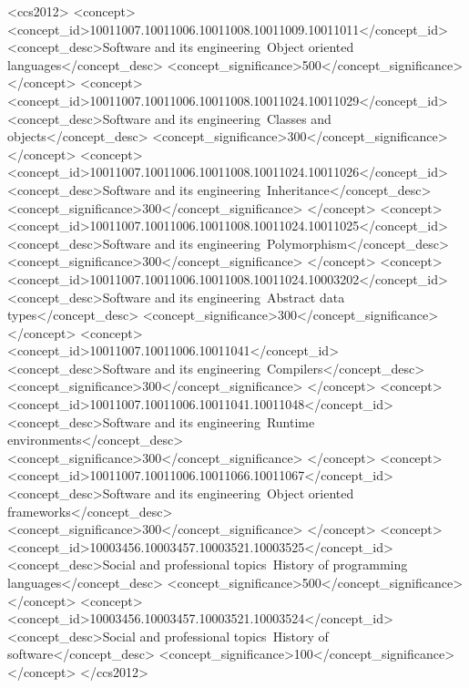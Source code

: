 \documentclass[acmsmall,screen]{acmart}
\begin{document}
\begin{CCSXML}
<ccs2012>
   <concept>
       <concept_id>10011007.10011006.10011008.10011009.10011011</concept_id>
       <concept_desc>Software and its engineering~Object oriented languages</concept_desc>
       <concept_significance>500</concept_significance>
       </concept>
   <concept>
       <concept_id>10011007.10011006.10011008.10011024.10011029</concept_id>
       <concept_desc>Software and its engineering~Classes and objects</concept_desc>
       <concept_significance>300</concept_significance>
       </concept>
   <concept>
       <concept_id>10011007.10011006.10011008.10011024.10011026</concept_id>
       <concept_desc>Software and its engineering~Inheritance</concept_desc>
       <concept_significance>300</concept_significance>
       </concept>
   <concept>
       <concept_id>10011007.10011006.10011008.10011024.10011025</concept_id>
       <concept_desc>Software and its engineering~Polymorphism</concept_desc>
       <concept_significance>300</concept_significance>
       </concept>
   <concept>
       <concept_id>10011007.10011006.10011008.10011024.10003202</concept_id>
       <concept_desc>Software and its engineering~Abstract data types</concept_desc>
       <concept_significance>300</concept_significance>
       </concept>
   <concept>
       <concept_id>10011007.10011006.10011041</concept_id>
       <concept_desc>Software and its engineering~Compilers</concept_desc>
       <concept_significance>300</concept_significance>
       </concept>
   <concept>
       <concept_id>10011007.10011006.10011041.10011048</concept_id>
       <concept_desc>Software and its engineering~Runtime environments</concept_desc>
       <concept_significance>300</concept_significance>
       </concept>
   <concept>
       <concept_id>10011007.10011006.10011066.10011067</concept_id>
       <concept_desc>Software and its engineering~Object oriented frameworks</concept_desc>
       <concept_significance>300</concept_significance>
       </concept>
   <concept>
       <concept_id>10003456.10003457.10003521.10003525</concept_id>
       <concept_desc>Social and professional topics~History of programming languages</concept_desc>
       <concept_significance>500</concept_significance>
       </concept>
   <concept>
       <concept_id>10003456.10003457.10003521.10003524</concept_id>
       <concept_desc>Social and professional topics~History of software</concept_desc>
       <concept_significance>100</concept_significance>
       </concept>
 </ccs2012>
\end{CCSXML}
\end{document}
